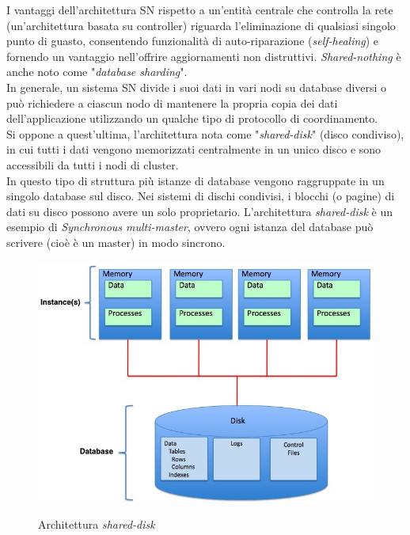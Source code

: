 I vantaggi dell'architettura SN rispetto a un'entit\`{a} centrale che controlla la rete (un'architettura basata su controller) riguarda l'eliminazione di qualsiasi singolo punto di guasto, consentendo funzionalit\`{a} di auto-riparazione (\textit{self-healing}) e fornendo un vantaggio nell'offrire aggiornamenti non distruttivi.\cite{etichetta6} 
\textit{Shared-nothing} \`{e} anche noto come "\textit{database sharding}". \\
In generale, un sistema SN divide i suoi dati in vari nodi su database diversi o pu\`{o} richiedere a ciascun nodo di mantenere la propria copia dei dati dell'applicazione utilizzando un qualche tipo di protocollo di coordinamento.\cite{etichetta5}\\


Si oppone a quest'ultima, l'architettura nota come "\textit{shared-disk}" (disco condiviso), in cui tutti i dati vengono memorizzati centralmente in un unico disco e sono accessibili da tutti i nodi di cluster.\cite{etichetta7}\\
In questo tipo di struttura pi\`{u} istanze di database vengono raggruppate in un singolo database sul disco. Nei sistemi di dischi condivisi, i blocchi (o pagine) di dati su disco possono avere un solo proprietario.
L'architettura \textit{shared-disk} \`{e} un esempio di \textit{Synchronous multi-master}, ovvero ogni istanza del database pu\`{o} scrivere (cio\`{e} \`{e} un master) in modo sincrono.\cite{etichetta7}

\begin{figure}[htbp]
\centering
\includegraphics[scale=0.50]{img/Shared_Disk_Architecture.jpg}\\
\caption{Architettura \textit{shared-disk}\label{figura1.2} \cite{etichetta7}}
\end{figure}
\\

